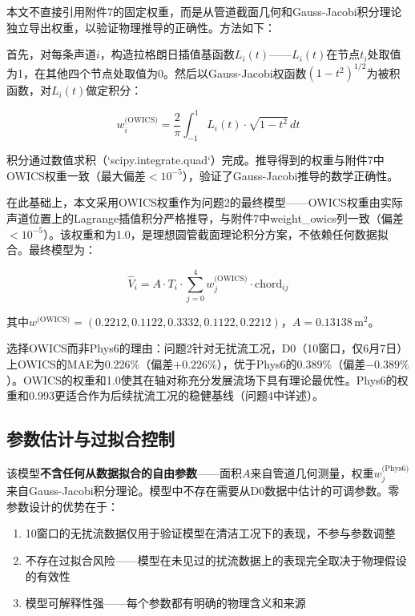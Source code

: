 本文不直接引用附件7的固定权重，而是从管道截面几何和Gauss-Jacobi积分理论独立导出权重，以验证物理推导的正确性。方法如下：

首先，对每条声道$i$，构造拉格朗日插值基函数$L_i(t)$——$L_i(t)$在节点$t_i$处取值为1，在其他四个节点处取值为0。然后以Gauss-Jacobi权函数$(1-t^2)^{1/2}$为被积函数，对$L_i(t)$做定积分：

\begin{equation}
w_i^{\text{(OWICS)}} = \frac{2}{\pi} \int_{-1}^{1} L_i(t) \cdot \sqrt{1 - t^2} \, dt
\label{eq:lagrange_integral}
\end{equation}

积分通过数值求积（`scipy.integrate.quad`）完成。推导得到的权重与附件7中OWICS权重一致（最大偏差$<10^{-5}$），验证了Gauss-Jacobi推导的数学正确性。

在此基础上，本文采用OWICS权重作为问题2的最终模型——OWICS权重由实际声道位置上的Lagrange插值积分严格推导，与附件7中weight\_owics列一致（偏差$<10^{-5}$）。该权重和为1.0，是理想圆管截面理论积分方案，不依赖任何数据拟合。最终模型为：

\begin{equation}
\hat{V}_i = A \cdot T_i \cdot \sum_{j=0}^{4} w_j^{\text{(OWICS)}} \cdot \text{chord}_{ij}
\label{eq:q2_model}
\end{equation}

其中$w^{\text{(OWICS)}} = (0.2212, 0.1122, 0.3332, 0.1122, 0.2212)$，$A = 0.13138$\,m$^2$。

选择OWICS而非Phys6的理由：问题2针对无扰流工况，D0（10窗口，仅6月7日）上OWICS的MAE为0.226\%（偏差$+0.226\%$），优于Phys6的0.389\%（偏差$-0.389\%$）。OWICS的权重和1.0使其在轴对称充分发展流场下具有理论最优性。Phys6的权重和0.993更适合作为后续扰流工况的稳健基线（问题4中详述）。

\subsection{参数估计与过拟合控制}

该模型\textbf{不含任何从数据拟合的自由参数}——面积$A$来自管道几何测量，权重$w_j^{\text{(Phys6)}}$来自Gauss-Jacobi积分理论。模型中不存在需要从D0数据中估计的可调参数。零参数设计的优势在于：

\begin{enumerate}
    \item 10窗口的无扰流数据仅用于验证模型在清洁工况下的表现，不参与参数调整
    \item 不存在过拟合风险——模型在未见过的扰流数据上的表现完全取决于物理假设的有效性
    \item 模型可解释性强——每个参数都有明确的物理含义和来源
\end{enumerate}

